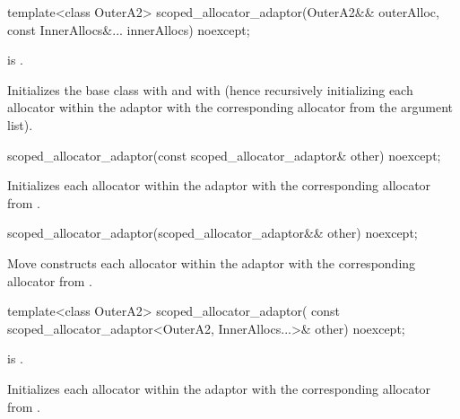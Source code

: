 %
\begin{itemdecl}
template<class OuterA2>
  scoped_allocator_adaptor(OuterA2&& outerAlloc, const InnerAllocs&... innerAllocs) noexcept;
\end{itemdecl}

\begin{itemdescr}
\pnum
\constraints
{} is .

\pnum
\effects
Initializes the  base class with
 and  with 
(hence recursively initializing each allocator within the adaptor with the corresponding
allocator from the argument list).
\end{itemdescr}

\begin{indexed}{
%
}
\begin{itemdecl}
scoped_allocator_adaptor(const scoped_allocator_adaptor& other) noexcept;
\end{itemdecl}
\end{indexed}

\begin{itemdescr}
\pnum
\effects
Initializes each allocator within the adaptor with the corresponding allocator
from .
\end{itemdescr}

\begin{indexed}{
%
}
\begin{itemdecl}
scoped_allocator_adaptor(scoped_allocator_adaptor&& other) noexcept;
\end{itemdecl}
\end{indexed}

\begin{itemdescr}
\pnum
\effects
Move constructs each allocator within the adaptor with the corresponding allocator
from .
\end{itemdescr}

%
\begin{itemdecl}
template<class OuterA2>
  scoped_allocator_adaptor(
    const scoped_allocator_adaptor<OuterA2, InnerAllocs...>& other) noexcept;
\end{itemdecl}

\begin{itemdescr}
\pnum
\constraints
{} is .

\pnum
\effects
Initializes each allocator within the adaptor with the corresponding allocator
from .
\end{itemdescr}

